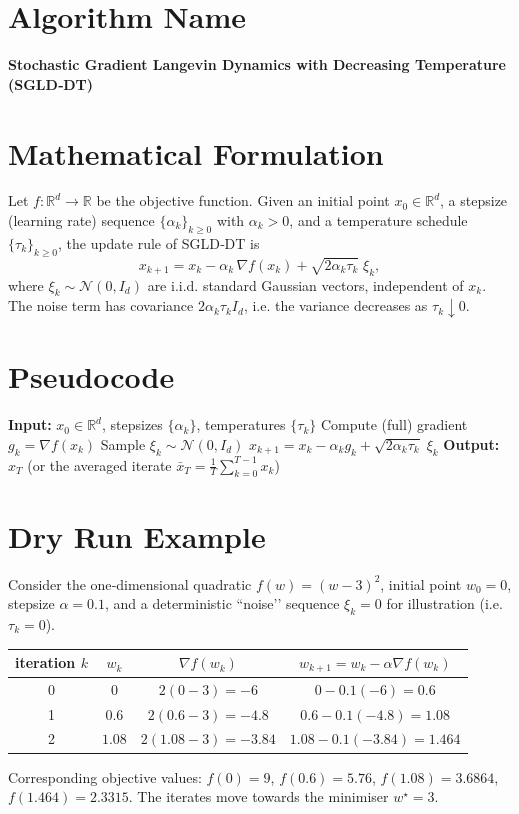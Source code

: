 \documentclass{article}
\newcommand{\R}{\mathbb{R}}
\begin{document}
\section*{Algorithm Name}
\textbf{Stochastic Gradient Langevin Dynamics with Decreasing Temperature (SGLD‑DT)}

\section*{Mathematical Formulation}
Let $f:\R^{d}\rightarrow\R$ be the objective function.  
Given an initial point $x_{0}\in\R^{d}$, a stepsize (learning rate) sequence
$\{\alpha_{k}\}_{k\ge 0}$ with $\alpha_{k}>0$, and a temperature schedule
$\{\tau_{k}\}_{k\ge0}$, the update rule of SGLD‑DT is
\[
\boxed{
x_{k+1}=x_{k}-\alpha_{k}\,\nabla f(x_{k})+\sqrt{2\alpha_{k}\tau_{k}}\;\xi_{k},
}
\tag{1}
\]
where $\xi_{k}\sim\mathcal{N}(0,I_{d})$ are i.i.d. standard Gaussian vectors,
independent of $x_{k}$.  
The noise term has covariance $2\alpha_{k}\tau_{k}I_{d}$, i.e. the variance
decreases as $\tau_{k}\downarrow0$.

\section*{Pseudocode}
\begin{algorithm}[H]
\caption{SGLD‑DT}
\begin{algorithmic}[1]
\STATE \textbf{Input:} $x_{0}\in\R^{d}$, stepsizes $\{\alpha_{k}\}$, temperatures $\{\tau_{k}\}$
    \STATE Compute (full) gradient $g_{k}= \nabla f(x_{k})$
    \STATE Sample $\xi_{k}\sim\mathcal{N}(0,I_{d})$
    \STATE $x_{k+1}=x_{k}-\alpha_{k} g_{k}+\sqrt{2\alpha_{k}\tau_{k}}\;\xi_{k}$
\ENDFOR
\STATE \textbf{Output:} $x_{T}$ (or the averaged iterate $\bar x_{T}=\frac{1}{T}\sum_{k=0}^{T-1}x_{k}$)
\end{algorithmic}
\end{algorithm}

\section*{Dry Run Example}
Consider the one‑dimensional quadratic $f(w)=(w-3)^{2}$, initial point $w_{0}=0$,
stepsize $\alpha=0.1$, and a deterministic “noise’’ sequence $\xi_{k}=0$ for
illustration (i.e. $\tau_{k}=0$).  

\begin{center}
\begin{tabular}{c|c|c|c}
iteration $k$ & $w_{k}$ & $\nabla f(w_{k})$ & $w_{k+1}=w_{k}-\alpha\nabla f(w_{k})$ \\ \hline
0 & $0$ & $2(0-3)=-6$ & $0-0.1(-6)=0.6$ \\
1 & $0.6$ & $2(0.6-3)=-4.8$ & $0.6-0.1(-4.8)=1.08$ \\
2 & $1.08$ & $2(1.08-3)=-3.84$ & $1.08-0.1(-3.84)=1.464$ \\
\end{tabular}
\end{center}
Corresponding objective values:
$f(0)=9$, $f(0.6)=5.76$, $f(1.08)=3.6864$, $f(1.464)=2.3315$.
The iterates move towards the minimiser $w^{\star}=3$.
\end{document}
